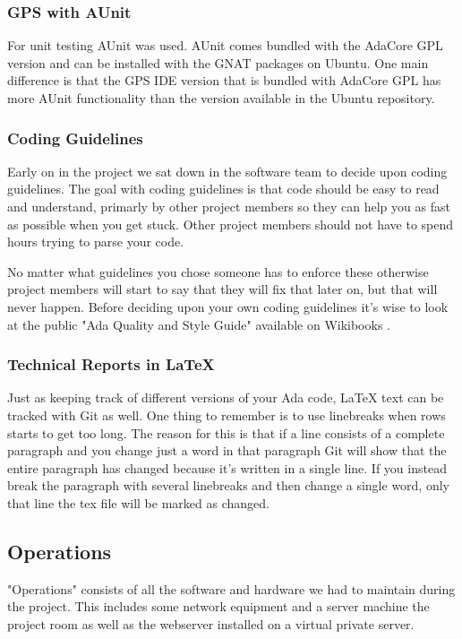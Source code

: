 \subsubsection{GPS with AUnit}
For unit testing AUnit was used. AUnit comes bundled with the AdaCore GPL version
and can be installed with the GNAT packages on Ubuntu. One main difference is that
the GPS IDE version that is bundled with AdaCore GPL has more AUnit functionality
than the version available in the Ubuntu repository.

\subsubsection{Coding Guidelines}
Early on in the project we sat down in the software team to decide upon coding
guidelines. The goal with coding guidelines is that code should be easy to read
and understand, primarly by other project members so they can help you as fast as
possible when you get stuck. Other project members should not have to spend hours
trying to parse your code.

No matter what guidelines you chose someone has
to enforce these otherwise project members will start to say that they will fix
that later on, but that will
never happen. Before deciding upon your own coding guidelines it's wise to look
at the public "Ada Quality and Style Guide" available on Wikibooks \cite{web:wikibooks-ada-style-guide}.

\subsubsection{Technical Reports in LaTeX}
Just as keeping track of different versions of your Ada code, LaTeX text can be tracked
with Git as well. One thing to remember is to use linebreaks when rows starts to
get too long. The reason for this is that if a line consists of a complete paragraph
and you change just a word in that paragraph Git will show that the entire paragraph
has changed because it's written in a single line. If you instead break the paragraph
with several linebreaks and then change a single word, only that line the tex file
will be marked as changed.

\subsection{Operations}
"Operations" consists of all the software and hardware we had to maintain during the
project. This includes some network equipment and a server machine the project room
as well as the webserver installed on a virtual private server.

